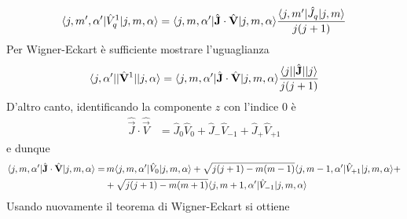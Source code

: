 \documentclass[a4paper, 11pt]{article}
\newcommand{\op}[1]{\hat{#1}}
\renewcommand{\op}[1]{\hat{#1}}
\begin{document}
\[\braketop{j,m',\alpha'}{\op V^1_q}{j,m,\alpha}=\braketop{j,m,\alpha'}{\op{\vec{J}}\cdot\op{\vec{V}}}{j,m,\alpha}\frac{\braketop{j,m'}{\op J_q}{j,m}}{j(j+1)}\]
Per Wigner-Eckart è sufficiente mostrare l'uguaglianza
\[\braketop{j,\alpha'}{|\op{\vec{V}}^1|}{j,\alpha}=\braketop{j,m,\alpha'}{\op{\vec{J}}\cdot\op{\vec{V}}}{j,m,\alpha}\frac{\braketop{j}{|\op{\vec{J}}|}{j}}{j(j+1)}\]
D'altro canto, identificando la componente $z$ con l'indice 0 è
\begin{align*}\op{\vec{J}}\cdot\op{\vec{V}}&=\op{J}_0\op V_0+\op J_-\op V_{-1}+\op J_+\op V_{+1}\end{align*}%
e dunque
\begin{align*}\braketop{j,m,\alpha'}{\op{\vec{J}}\cdot\op{\vec{V}}}{j,m,\alpha}=&\,m\braketop{j,m,\alpha'}{\op V_0}{j,m,\alpha}+\sqrt{j(j+1)-m(m-1)}\braketop{j,m-1,\alpha'}{\op V_{+1}}{j,m,\alpha}+\\&+\sqrt{j(j+1)-m(m+1)}\braketop{j,m+1,\alpha'}{\op V_{-1}}{j,m,\alpha}\end{align*}
Usando nuovamente il teorema di Wigner-Eckart si ottiene
\end{document}
